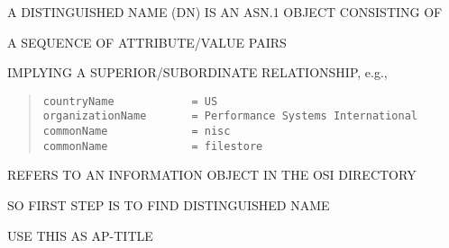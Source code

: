 \begin{bwslide}

\begin{nrtc}
\item	A DISTINGUISHED NAME (DN) IS AN ASN.1 OBJECT CONSISTING OF
    \begin{nrtc}
    \item	A SEQUENCE OF ATTRIBUTE/VALUE PAIRS
    \end{nrtc}
    IMPLYING A SUPERIOR/SUBORDINATE RELATIONSHIP, e.g.,
\begin{quote}\small\begin{verbatim}
countryName            = US
organizationName       = Performance Systems International
commonName             = nisc
commonName             = filestore
\end{verbatim}\end{quote}
REFERS TO AN INFORMATION OBJECT IN THE OSI DIRECTORY

\item	SO FIRST STEP IS TO FIND DISTINGUISHED NAME
    \begin{nrtc}
    \item	USE THIS AS AP-TITLE
    \end{nrtc}
\end{nrtc}
\end{bwslide}


